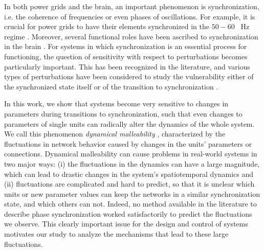 In both power grids and the brain, an important phenomenon is synchronization, i.e. the coherence of frequencies or even phases of oscillations. For example, it is crucial for power grids to have their elements synchronized in the $50-60$ \SI{}{\hertz} regime \cite{witthaut2022collective}. Moreover, several functional roles have been ascribed to synchronization in the brain \cite{fries2015rhythms, varela2001brainweb, singer1999neuronal}.  For systems in which synchronization is an essential process for functioning, the question of sensitivity with respect to perturbations becomes particularly important. This has been recognized in the literature, and various types of perturbations have been considered to study the vulnerability either of the synchronized state itself or of the transition to synchronization \cite{pikovsky2001synchronization, arenas2008synchronization}.

In this work, we show that systems become very sensitive to changes in parameters during transitions to synchronization, such that even changes to parameters of single units can radically alter the dynamics of the whole system.
We call this phenomenon \textit{dynamical malleability} \cite{budzinski2020synchronization}, characterized by the fluctuations in network behavior caused by changes in the units' parameters or connections. Dynamical malleability can cause problems in real-world systems in two major ways: (i) the fluctuations in the dynamics can have a large magnitude, which can lead to drastic changes in the system's spatiotemporal dynamics and (ii) fluctuations are complicated and hard to predict, so that it is unclear which units or new parameter values can keep the networks in a similar synchronization state, and which others can not. Indeed, no method available in the literature to describe phase synchronization worked satisfactorily to predict the fluctuations we observe. This clearly important issue for the design and control of systems motivates our study to analyze the mechanisms that lead to these large fluctuations. 

